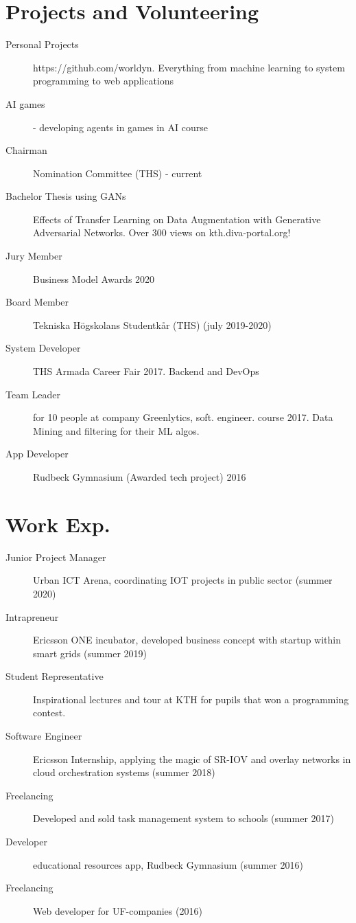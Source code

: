 \documentclass[margin,line,a4paper]{resume}
\begin{document}
\begin{resume}
\section{\mysidestyle Projects and Volunteering}\vspace{1mm}
\begin{description}
   \item[Personal Projects] https://github.com/worldyn. Everything from machine learning to system programming to web applications
   \item [AI games] - developing agents in games in AI course
     \item[Chairman] Nomination Committee (THS) - current 
    \item[Bachelor Thesis using GANs] Effects of Transfer Learning on Data Augmentation with Generative Adversarial Networks. Over 300 views on kth.diva-portal.org!
    \item[Jury Member] Business Model Awards 2020 
    \item[Board Member] Tekniska Högskolans Studentkår (THS) (july 2019-2020)
    \item[System Developer] THS Armada Career Fair 2017. Backend and DevOps
    \item[Team Leader] for 10 people at company Greenlytics, soft. engineer. course 2017. Data Mining and filtering for their ML algos.
    \item[App Developer] Rudbeck Gymnasium (Awarded tech project) 2016

\end{description}  
  
\section{\mysidestyle Work Exp.}\vspace{1mm}
\begin{description}
   \item[Junior Project Manager] Urban ICT Arena, coordinating IOT projects in public sector (summer 2020)
    \item[Intrapreneur] Ericsson ONE incubator, developed business concept with startup within smart grids (summer 2019)
    \item[Student Representative] Inspirational lectures and tour at KTH for pupils that won a programming contest.
    \item[Software Engineer] Ericsson Internship, applying the magic of SR-IOV and overlay networks in cloud orchestration systems (summer 2018)
    \item[Freelancing] Developed and sold task management system to schools (summer 2017)
    \item[Developer] educational resources app, Rudbeck Gymnasium (summer 2016)
    \item[Freelancing] Web developer for UF-companies (2016)
\end{description}


\end{resume}
\end{document}
